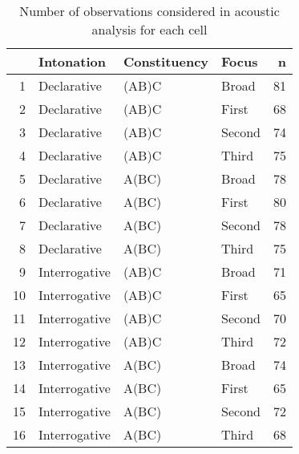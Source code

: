 \begin{table}[ht]
\centering
\begingroup\footnotesize
\begin{tabular}{rlllr}
  \hline
 & Intonation & Constituency & Focus & n \\ 
  \hline
1 & Declarative & (AB)C & Broad &  81 \\ 
  2 & Declarative & (AB)C & First &  68 \\ 
  3 & Declarative & (AB)C & Second &  74 \\ 
  4 & Declarative & (AB)C & Third &  75 \\ 
  5 & Declarative & A(BC) & Broad &  78 \\ 
  6 & Declarative & A(BC) & First &  80 \\ 
  7 & Declarative & A(BC) & Second &  78 \\ 
  8 & Declarative & A(BC) & Third &  75 \\ 
  9 & Interrogative & (AB)C & Broad &  71 \\ 
  10 & Interrogative & (AB)C & First &  65 \\ 
  11 & Interrogative & (AB)C & Second &  70 \\ 
  12 & Interrogative & (AB)C & Third &  72 \\ 
  13 & Interrogative & A(BC) & Broad &  74 \\ 
  14 & Interrogative & A(BC) & First &  65 \\ 
  15 & Interrogative & A(BC) & Second &  72 \\ 
  16 & Interrogative & A(BC) & Third &  68 \\ 
   \hline
\end{tabular}
\endgroup
\caption{Number of observations considered in acoustic analysis for each cell} 
\label{numberObservations}
\end{table}
